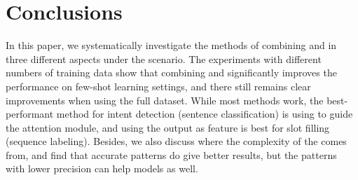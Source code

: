 \section{Conclusions}
In this paper, we systematically investigate the methods of combining \NN and \RE in three different aspects under the \NLU scenario. The experiments with different numbers of training data show that combining \NN and \RE significantly improves the performance on few-shot learning settings, and there still remains clear improvements when using the full dataset. While most methods work, the best-performant method for intent detection (sentence classification) is using \RE to guide the attention module, and using the \RE output as feature is best for slot filling (sequence labeling). Besides, we also discuss where the complexity of the \RE comes from, and find that accurate \RE patterns do give better results, but the patterns with lower precision can help \NN models as well.